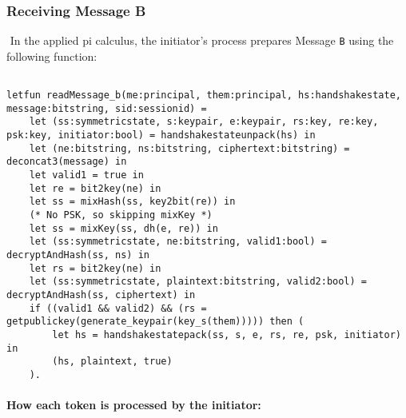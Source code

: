 \subsubsection{Receiving Message B}$ $
In the applied pi calculus, the initiator's process prepares Message \texttt{B} using the following function:


\begin{lstlisting}

letfun readMessage_b(me:principal, them:principal, hs:handshakestate, message:bitstring, sid:sessionid) =
	let (ss:symmetricstate, s:keypair, e:keypair, rs:key, re:key, psk:key, initiator:bool) = handshakestateunpack(hs) in
	let (ne:bitstring, ns:bitstring, ciphertext:bitstring) = deconcat3(message) in
	let valid1 = true in
	let re = bit2key(ne) in
	let ss = mixHash(ss, key2bit(re)) in
	(* No PSK, so skipping mixKey *)
	let ss = mixKey(ss, dh(e, re)) in
	let (ss:symmetricstate, ne:bitstring, valid1:bool) = decryptAndHash(ss, ns) in
	let rs = bit2key(ne) in
	let (ss:symmetricstate, plaintext:bitstring, valid2:bool) = decryptAndHash(ss, ciphertext) in
	if ((valid1 && valid2) && (rs = getpublickey(generate_keypair(key_s(them))))) then (
		let hs = handshakestatepack(ss, s, e, rs, re, psk, initiator) in
		(hs, plaintext, true)
	).

\end{lstlisting}

\paragraph{How each token is processed by the initiator:}$ $

